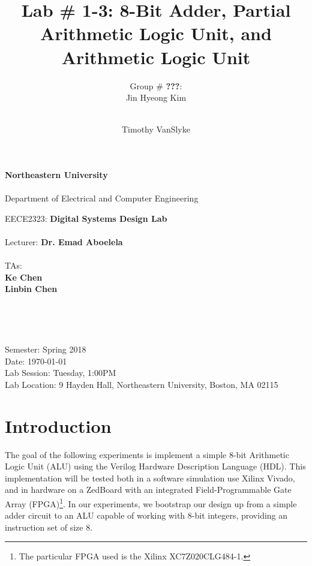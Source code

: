 \documentclass[12pt, letterpaper]{article}
\title{Lab \# 1-3: \textbf{8-Bit Adder, Partial Arithmetic Logic Unit, and Arithmetic Logic Unit}}
\author{Group \# \textbf{\color{red}???}:\\ Jin Hyeong Kim \and\\ Timothy VanSlyke}
\begin{document}
\begin{titlepage}
	\begin{center}
		{\Large
			\textbf{Northeastern University}\\
			~\\
			Department of Electrical and Computer Engineering\\ 
		}

		\vfill

		{\large
			EECE2323: \textbf{Digital Systems Design Lab}\\
			~\\
			Lecturer: \textbf{Dr. Emad Aboelela}\\
			~\\
			TAs:\\
			\textbf{Ke Chen}\\
			\textbf{Linbin Chen}\\
		}
	
		\vfill

		{\Large \thetitle}\\
	
		\vfill

		{\large \theauthor}\\

		\vfill

		{\large
			Semester: Spring 2018\\
			Date: \today\\
			Lab Session: Tuesday, 1:00PM\\ 
			Lab Location: 9 Hayden Hall, Northeastern University, Boston, MA 02115\\
		}

	\end{center}
\end{titlepage}

\tableofcontents

\newpage
\section{Introduction}
The goal of the following experiments is implement a simple 8-bit Arithmetic Logic Unit (ALU) using the Verilog Hardware Description Language (HDL).  This implementation will be tested both in a software simulation use Xilinx Vivado, and in hardware on a ZedBoard with an integrated Field-Programmable Gate Array (FPGA)\footnote{The particular FPGA used is the Xilinx XC7Z020CLG484-1.}.  In our experiments, we bootstrap our design up from a simple adder circuit to an ALU capable of working with 8-bit integers, providing an instruction set of size 8.  
\end{document}
